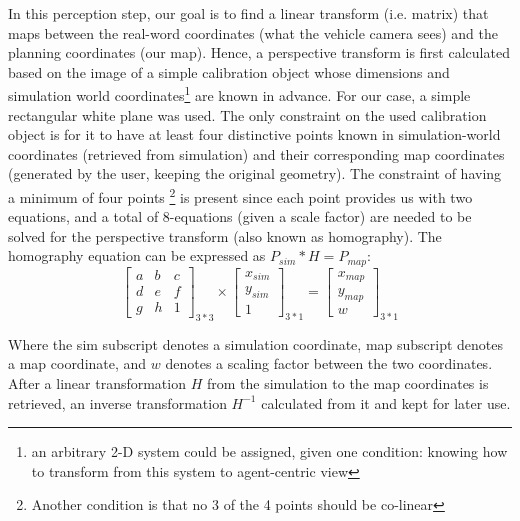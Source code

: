 In this perception step, our goal is to find a linear transform (i.e. matrix) that maps between the real-word coordinates (what the vehicle camera sees) and the planning coordinates (our map). Hence, a perspective transform is first calculated based on the image of a simple calibration object whose dimensions and simulation world coordinates\footnote{an arbitrary 2-D system could be assigned, given one condition: knowing how to transform from this system to agent-centric view} are known in advance. For our case, a simple rectangular white plane was used. The only constraint on the used calibration object is for it to have at least four distinctive points known in simulation-world coordinates (retrieved from simulation) and their corresponding map coordinates (generated by the user, keeping the original geometry). The constraint of having a minimum of four points \footnote{Another condition is that no 3 of the 4 points should be co-linear} is present since each point provides us with two equations, and a total of 8-equations (given a scale factor) are needed to be solved for the perspective transform (also known as homography). The homography equation can be expressed as $P_{sim} * H = P_{map} $:
\begin{equation}
\begin{bmatrix}a & b & c \\ d & e  & f \\ g & h & 1\end{bmatrix}_{3*3} \times
\begin{bmatrix}x_{sim} \\ y_{sim} \\ 1 \end{bmatrix} _{3*1} = \begin{bmatrix}x_{map} \\ y_{map} \\ w \end{bmatrix} _{3*1}
\end{equation}



Where the sim subscript denotes a simulation coordinate, map subscript denotes a map coordinate, and $w$ denotes a scaling factor between the two coordinates. \\
After a linear transformation $H$ from the simulation to the map coordinates is retrieved, an inverse transformation $H^{-1}$ calculated from it and kept for later use.\\


